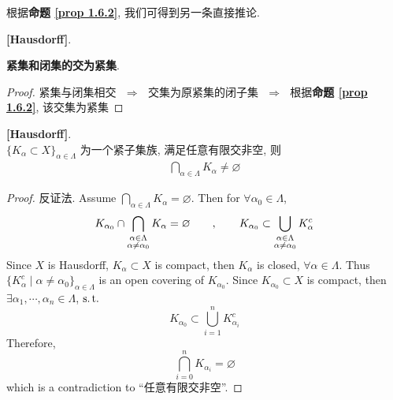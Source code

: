 	\vspace{8em}
	
	根据\textbf{命题 \ref{prop 1.6.2}}, 我们可得到另一条直接推论.
	\begin{corollary}\label{cor 1.6.1}
		\textbf{[Hausdorff]}. 
		\begin{center}
			\textbf{紧集和闭集的交为紧集}.
		\end{center}
		
		\vspace{1em}
		
		\begin{proof}
			紧集与闭集相交 $\,\, \Rightarrow \,\,$ 交集为原紧集的闭子集 $\,\, \Rightarrow \,\,$ 根据\textbf{命题 \ref{prop 1.6.2}}, 该交集为紧集
		\end{proof}
	\end{corollary}

	\newpage
	
	\begin{proposition}\label{prop 1.6.3}
		\textbf{[Hausdorff]}. \\
		$\{ K_\alpha \subset X \}_{\alpha \in \Lambda}$ 为一个紧子集族, 满足任意有限交非空, 则
		\begin{align}
			\bigcap_{\alpha \in \Lambda} K_\alpha \neq \varnothing
		\end{align}
		
		\vspace{1em}
		
		\begin{proof}
			反证法. Assume $\underset{\alpha \in \Lambda}{\bigcap} K_\alpha = \varnothing$. Then for $\forall \alpha_0 \in \Lambda$,
			\[ K_{\alpha_0} \cap \bigcap_{\substack{\alpha \in \Lambda \\ \alpha \neq \alpha_0}} K_{\alpha} = \varnothing 
			\hspace*{2em} , \hspace*{2em} 
			K_{\alpha_0} \subset \bigcup_{\substack{\alpha \in \Lambda \\ \alpha \neq \alpha_0}} K_{\alpha}^c \]
			Since $X$ is Hausdorff, $K_\alpha \subset X$ is compact, then $K_\alpha$ is closed, $\forall \alpha \in \Lambda$. Thus \\
			$\{ K_{\alpha}^c \mid \alpha \neq \alpha_0 \}_{\alpha \in \Lambda}$ is an open covering of $K_{\alpha_0}$. Since $K_{\alpha_0} \subset X$ is compact, then $\exists \alpha_1 , \cdots , \alpha_n \in \Lambda$, $\operatorname{s.t.}$
			\[ K_{\alpha_0} \subset \bigcup_{i = 1}^{n} K_{\alpha_i}^c \]
			Therefore, 
			\[ \bigcap_{i = 0}^{n} K_{\alpha_i} = \varnothing \]
			which is a contradiction to “任意有限交非空”.
		\end{proof}
	\end{proposition}
	
